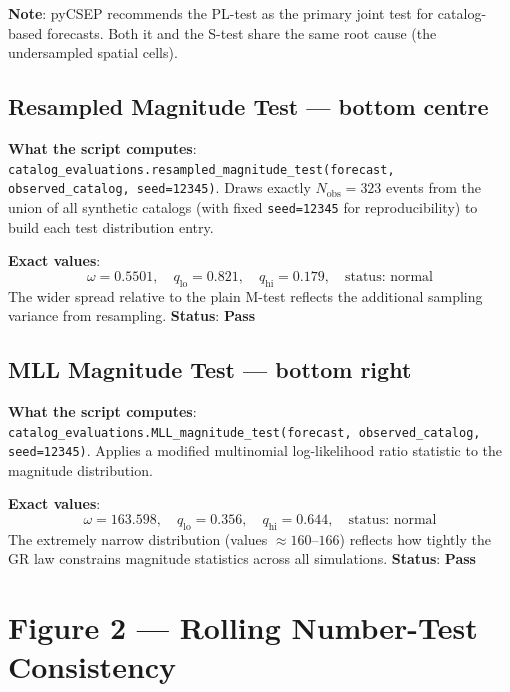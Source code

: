 \documentclass[12pt,a4paper]{article}
\begin{document}
\textbf{Note}: pyCSEP recommends the PL-test as the primary joint test for
catalog-based forecasts. Both it and the S-test share the same root cause
(the undersampled spatial cells).

\subsection{Resampled Magnitude Test --- bottom centre}

\textbf{What the script computes}:
\texttt{catalog\_evaluations.resampled\_magnitude\_test(forecast,
observed\_catalog, seed=12345)}.
Draws exactly $N_\text{obs} = 323$ events from the union of all synthetic
catalogs (with fixed \texttt{seed=12345} for reproducibility) to build each
test distribution entry.

\textbf{Exact values}:
\[
    \omega = 0.5501, \quad
    q_\text{lo} = 0.821, \quad q_\text{hi} = 0.179, \quad \text{status: normal}
\]
The wider spread relative to the plain M-test reflects the additional
sampling variance from resampling.
\textbf{Status}: \textcolor{passgreen}{\textbf{Pass}}

\subsection{MLL Magnitude Test --- bottom right}

\textbf{What the script computes}:
\texttt{catalog\_evaluations.MLL\_magnitude\_test(forecast, observed\_catalog,
seed=12345)}.
Applies a modified multinomial log-likelihood ratio statistic to the
magnitude distribution.

\textbf{Exact values}:
\[
    \omega = 163.598, \quad
    q_\text{lo} = 0.356, \quad q_\text{hi} = 0.644, \quad \text{status: normal}
\]
The extremely narrow distribution (values $\approx 160$--$166$) reflects
how tightly the GR law constrains magnitude statistics across all simulations.
\textbf{Status}: \textcolor{passgreen}{\textbf{Pass}}

\section{Figure 2 --- Rolling Number-Test Consistency}
\label{sec:rolling}
\end{document}
